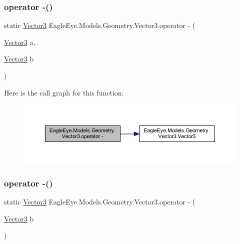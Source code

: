 \subsubsection{\texorpdfstring{operator -\/()}{operator -()}\hspace{0.1cm}{\footnotesize\ttfamily [1/2]}}
{\footnotesize\ttfamily static \mbox{\hyperlink{struct_eagle_eye_1_1_models_1_1_geometry_1_1_vector3}{Vector3}} Eagle\+Eye.\+Models.\+Geometry.\+Vector3.\+operator -\/ (\begin{DoxyParamCaption}\item[{\mbox{\hyperlink{struct_eagle_eye_1_1_models_1_1_geometry_1_1_vector3}{Vector3}}}]{a,  }\item[{\mbox{\hyperlink{struct_eagle_eye_1_1_models_1_1_geometry_1_1_vector3}{Vector3}}}]{b }\end{DoxyParamCaption})\hspace{0.3cm}{\ttfamily [static]}}

Here is the call graph for this function\+:\nopagebreak
\begin{figure}[H]
\begin{center}
\leavevmode
\includegraphics[width=350pt]{struct_eagle_eye_1_1_models_1_1_geometry_1_1_vector3_abe683a8c17b442bbe4c9d86a8af44be2_cgraph}
\end{center}
\end{figure}
\mbox{\label{struct_eagle_eye_1_1_models_1_1_geometry_1_1_vector3_ae13e288358da8512159f0d6678e4bc12}} 
\subsubsection{\texorpdfstring{operator -\/()}{operator -()}\hspace{0.1cm}{\footnotesize\ttfamily [2/2]}}
{\footnotesize\ttfamily static \mbox{\hyperlink{struct_eagle_eye_1_1_models_1_1_geometry_1_1_vector3}{Vector3}} Eagle\+Eye.\+Models.\+Geometry.\+Vector3.\+operator -\/ (\begin{DoxyParamCaption}\item[{\mbox{\hyperlink{struct_eagle_eye_1_1_models_1_1_geometry_1_1_vector3}{Vector3}}}]{b }\end{DoxyParamCaption})\hspace{0.3cm}{\ttfamily [static]}}

